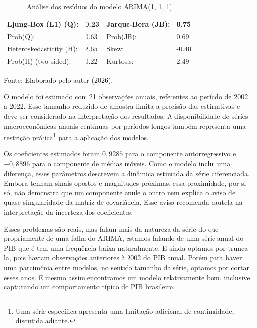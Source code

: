\begin{table}[htbp]
	\centering
	\captionsetup{justification=centering}
	\caption{Análise dos resíduos do modelo ARIMA(1, 1, 1)}
	\label{tab:residuos_arima}
	\begin{tabular}{llll}
		\toprule
		Ljung-Box (L1) (Q): & 0.23 &   Jarque-Bera (JB):   & 0.75 \\
		\midrule
		Prob(Q): & 0.63 &   Prob(JB):           & 0.69 \\
		Heteroskedasticity (H): & 2.65 &   Skew:               & -0.40 \\
		Prob(H) (two-sided): & 0.22 &   Kurtosis:           & 2.49 \\
		\bottomrule
	\end{tabular}
	
	\vspace{0.1cm}
	
	\centering
	\small Fonte: Elaborado pelo autor (2026).
\end{table}


O modelo foi estimado com 21 observações anuais, referentes ao período de 2002 a 2022. Esse tamanho reduzido de amostra limita a precisão das estimativas e deve ser considerado na interpretação dos resultados. A disponibilidade de séries macroeconômicas anuais contínuas por períodos longos também representa uma restrição prática\footnote{Uma série específica apresenta uma limitação adicional de continuidade, discutida adiante.} para a aplicação dos modelos.

Os coeficientes estimados foram $0{,}9285$ para o componente autorregressivo e $-0{,}8896$ para o componente de médias móveis. Como o modelo inclui uma diferença, esses parâmetros descrevem a dinâmica estimada da série diferenciada. Embora tenham sinais opostos e magnitudes próximas, essa proximidade, por si só, não demonstra que um componente anule o outro nem explica o aviso de quase singularidade da matriz de covariância. Esse aviso recomenda cautela na interpretação da incerteza dos coeficientes.

Esses problemas são reais, mas falam mais da natureza da série do que propriamente de uma falha do ARIMA, estamos falando de uma série anual do PIB que é tem uma frequência baixa naturalmente. E ainda optamos por trunca-la, pois haviam observações anteriores à 2002 do PIB anual. Porém para haver uma parcimônia entre modelos, no sentido tamanho da série, optamos por cortar esses anos. E mesmo assim encontramos um modelo relativamente bom, inclusive capturando um comportamento típico do PIB brasileiro. 

